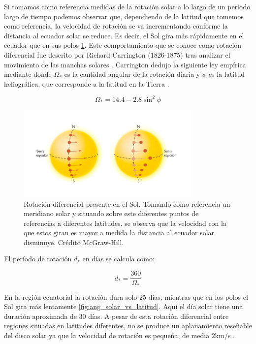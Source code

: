 Si tomamos como referencia medidas de la rotación solar a lo largo de un período largo de tiempo podemos observar que, dependiendo de la latitud que tomemos como referencia, la velocidad de rotación se va incrementando conforme la distancia al ecuador solar se reduce. Es decir, el Sol gira más rápidamente en el ecuador que en sus polos \ref{fig:rot_solar_vs_latitud}. Este comportamiento que se conoce como rotación diferencial fue descrito por Richard Carrington (1826-1875) tras analizar el movimiento de las manchas solares \cite{Carrington1863}. Carrington dedujo la siguiente ley empírica mediante donde $\Omega_*$ es la cantidad angular de la rotación diaria y $\phi$ es la latitud heliográfica, que corresponde a la latitud en la Tierra  \cite{Banisch2009}.\par

\begin{ceqn}
\begin{equation}
    \Omega_* = 14.4 - 2.8\sin^2\phi \label{eq:ang_rot_sun}
\end{equation}
\end{ceqn}

\begin{figure}
    \centering
    \includegraphics[width=0.8\textwidth]{img/tesis/sun_1.png}
    \caption{Rotación diferencial presente en el Sol. Tomando como referencia un meridiano solar y situando sobre este diferentes puntos de referencias a diferentes latitudes, se observa que la velocidad con la que estos giran es mayor a medida la distancia al ecuador solar disminuye. Crédito McGraw-Hill.}
    \label{fig:rot_solar_vs_latitud}
\end{figure}

El período de rotación $d_*$ en días se calcula como:

\begin{equation}\label{eq:dia_solar}
    d_* = \frac{360}{\Omega_*}
\end{equation}

En la región ecuatorial la rotación dura solo 25 días, mientras que en los polos el Sol gira más lentamente \ref{fig:ang_solar_vs_latitud}. Aquí el día solar tiene una duración aproximada de 30 días. A pesar de esta rotación diferencial entre regiones situadas en latitudes diferentes, no se produce un aplanamiento reseñable del disco solar ya que la velocidad de rotación es pequeña, de media 2km/s \cite{Gill2012}.\par


